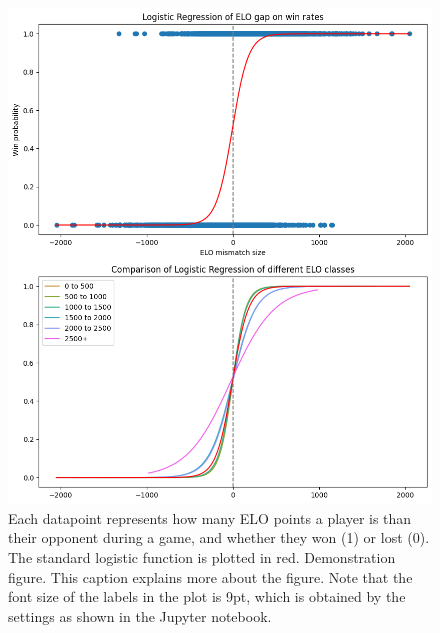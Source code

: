 \documentclass[10pt,a4paper,twocolumn]{article}
\begin{document}
\begin{figure}[t]
  \centering
  \includegraphics{report/images/log_regression_dual.png}
  \caption{Each datapoint represents how many ELO points a player is than their opponent during a game, and whether they won (1) or lost (0). The standard logistic function is plotted in red.
  Demonstration figure. This caption explains more about the figure. Note that the font size of the labels in the plot is 9pt, which is obtained by the settings as shown in the Jupyter notebook.}
  \label{fds-project-template:fig:log_regression}
\end{figure}

\end{document}
